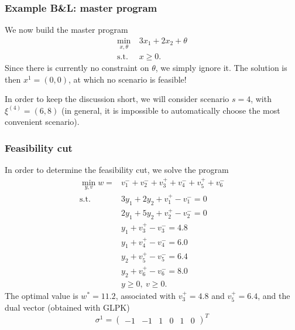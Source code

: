 \documentclass[aspectratio=169]{beamer}
\begin{document}
\begin{frame}
	\frametitle{Example B\&L: master program}
	
	We now build the master program
	\begin{align*}
	\min_{x, \theta}\ & 3x_1 + 2x_2 + \theta \\
	\text{s.t. } & x \geq 0.
	\end{align*}
	Since there is currently no constraint on $\theta$, we simply ignore it.
	The solution is then $x^1 = (0,0)$, at which no scenario is feasible!
	
	\mbox{}
	
	In order to keep the discussion short, we will consider scenario $s = 4$, with $\xi^{(4)} = (6,8)$ (in general, it is impossible to automatically choose the most convenient scenario).
	
\end{frame}

\begin{frame}
	\frametitle{Feasibility cut}
	
	\small
	In order to determine the feasibility cut, we solve the program
	\begin{align*}
	\min_{y,v} w = & v_1^-+v_2^-+v_3^++v_4^-+v_5^++v_6^- \\
	\text{s.t. } & 3y_1 + 2y_2 + v_1^+ - v_1^- = 0 \\
	& 2y_1 + 5y_2 + v_2^+ - v_2^- = 0 \\
	& y_1 + v_3^+ - v_3^- = 4.8 \\
	& y_1 + v_4^+ - v_4^- = 6.0 \\
	& y_2 + v_5^+ - v_5^- = 6.4 \\
	& y_2 + v_6^+ - v_6^- = 8.0 \\
	& y \geq 0,\ v \geq 0.
	\end{align*}
	The optimal value is $w^* = 11.2$, associated with $v^+_3 = 4.8$ and $v^+_5 = 6.4$, and the dual vector (obtained with GLPK)
	\[
	\sigma^1 = \begin{pmatrix} -1 & -1 & 1 & 0 & 1 & 0 \end{pmatrix}^T
	\]
	
\end{frame}
\end{document}
